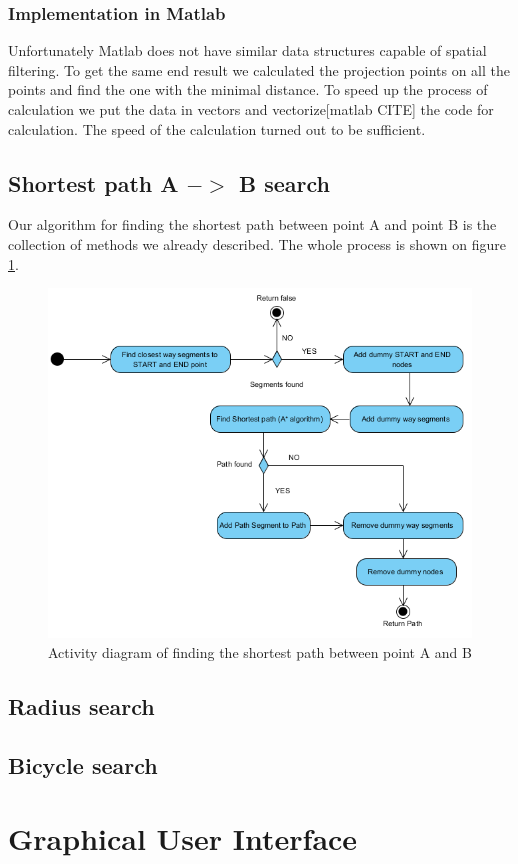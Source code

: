 \documentclass[reqno,openany,12pt]{amsbook}
\theoremstyle{definition}
\theoremstyle{remark}
\begin{document}
\subsection{Implementation in Matlab}
Unfortunately Matlab does not have similar data structures capable of spatial filtering. To get the same end result we calculated the projection points on all the points and find the one with the minimal distance. To speed up the process of calculation we put the data in vectors and vectorize[matlab CITE] the code for calculation. The speed of the calculation turned out to be sufficient.

\section{Shortest path A $->$ B search}
Our algorithm for finding the shortest path between point A and point B is the collection of methods we already described. The whole process is shown on figure \ref{fig:ab_activity}.
 \begin{figure}[h]
 \centering
 \includegraphics[width=0.7\linewidth]{../photos/shortest_path_ab_activity.png}
 \caption{Activity diagram of finding the shortest path between point A and B}
 \label{fig:ab_activity}
 \end{figure}

\section{Radius search}
\section{Bicycle search}
\chapter{Graphical User Interface}
\end{document}

